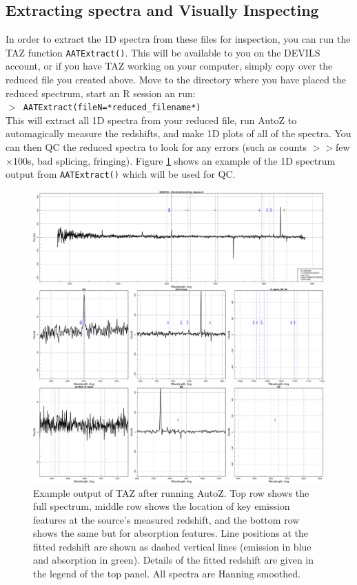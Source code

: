 \documentclass[12pt]{article}
\begin{document}
\subsection{Extracting spectra and Visually Inspecting}

In order to extract the 1D spectra from these files for inspection, you can run the TAZ function \texttt{AATExtract()}. This will be available to you on the DEVILS account, or if you have TAZ working on your computer, simply copy over the reduced file you created above. Move to the directory where you have placed the reduced spectrum, start an R session an run:\\

 \texttt{$>$ AATExtract(fileN=*reduced\_filename*)}\\
 
This will extract all 1D spectra from your reduced file, run AutoZ to automagically measure the redshifts, and make 1D plots of all of the spectra. You can then QC the reduced spectra to look for any errors (such as counts $>>$few$\times$100s, bad splicing, fringing). Figure \ref{fig:specEx} shows an example of the 1D spectrum output from \texttt{AATExtract()} which will be used for QC.   


\begin{figure}
\begin{center}
\includegraphics[scale=0.4]{G006158.pdf}
\caption{Example output of TAZ after running AutoZ. Top row shows the full spectrum, middle row shows the location of key emission features at the source's measured redshift, and the bottom row shows the same but for absorption features. Line positions at the fitted redshift are shown as dashed vertical lines (emission in blue and absorption in green). Details of the fitted redshift are given in the legend of the top panel. All spectra are Hanning smoothed.}
\label{fig:specEx}
\end{center}
\end{figure}
\end{document}
